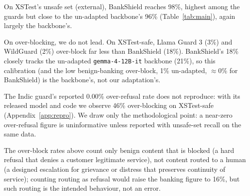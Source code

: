 \documentclass[11pt]{article}
\begin{document}
On XSTest's unsafe set (external), BankShield reaches 98\%, highest among the guards but close to the un-adapted backbone's 96\% (Table~\ref{tab:main}), again largely the backbone's.

On over-blocking, we do not lead. On XSTest-safe, Llama Guard 3 (3\%) and WildGuard (2\%) over-block far less than BankShield (18\%). BankShield's 18\% closely tracks the un-adapted \texttt{gemma-4-12B-it} backbone (21\%), so this calibration (and the low benign-banking over-block, 1\% un-adapted, $\approx$0\% for BankShield) is the backbone's, not our adaptation's.

The Indic guard's reported 0.00\% over-refusal rate does not reproduce: with its released model and code we observe 46\% over-blocking on XSTest-safe (Appendix~\ref{app:repro}). We draw only the methodological point: a near-zero over-refusal figure is uninformative unless reported with unsafe-set recall on the same data.

The over-block rates above count only benign content that is blocked (a hard refusal that denies a customer legitimate service), not content routed to a human (a designed escalation for grievance or distress that preserves continuity of service); counting routing as refusal would raise the banking figure to 16\%, but such routing is the intended behaviour, not an error.
\end{document}
